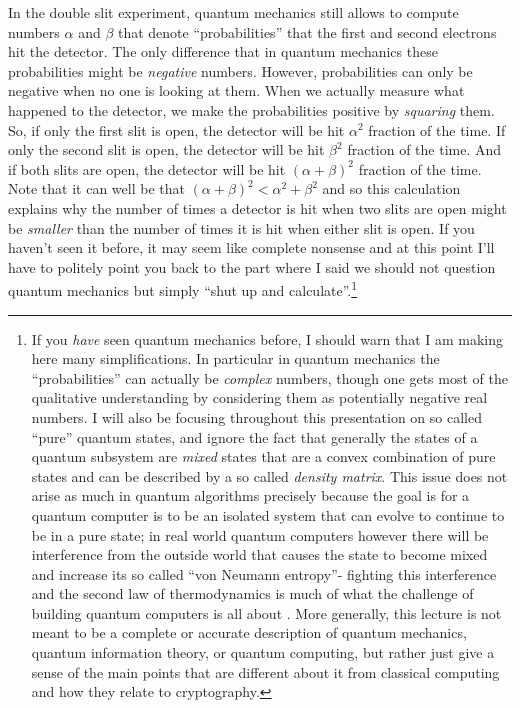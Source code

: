 In the double slit experiment, quantum mechanics still allows to compute
numbers \(\alpha\) and \(\beta\) that denote ``probabilities'' that the
first and second electrons hit the detector. The only difference that in
quantum mechanics these probabilities might be \emph{negative} numbers.
However, probabilities can only be negative when no one is looking at
them. When we actually measure what happened to the detector, we make
the probabilities positive by \emph{squaring} them. So, if only the
first slit is open, the detector will be hit \(\alpha^2\) fraction of
the time. If only the second slit is open, the detector will be hit
\(\beta^2\) fraction of the time. And if both slits are open, the
detector will be hit \((\alpha+\beta)^2\) fraction of the time. Note
that it can well be that \((\alpha+\beta)^2 < \alpha^2 + \beta^2\) and
so this calculation explains why the number of times a detector is hit
when two slits are open might be \emph{smaller} than the number of times
it is hit when either slit is open. If you haven't seen it before, it
may seem like complete nonsense and at this point I'll have to politely
point you back to the part where I said we should not question quantum
mechanics but simply ``shut up and calculate''.\footnote{If you
  \emph{have} seen quantum mechanics before, I should warn that I am
  making here many simplifications. In particular in quantum mechanics
  the ``probabilities'' can actually be \emph{complex} numbers, though
  one gets most of the qualitative understanding by considering them as
  potentially negative real numbers. I will also be focusing throughout
  this presentation on so called ``pure'' quantum states, and ignore the
  fact that generally the states of a quantum subsystem are \emph{mixed}
  states that are a convex combination of pure states and can be
  described by a so called \emph{density matrix}. This issue does not
  arise as much in quantum algorithms precisely because the goal is for
  a quantum computer is to be an isolated system that can evolve to
  continue to be in a pure state; in real world quantum computers
  however there will be interference from the outside world that causes
  the state to become mixed and increase its so called ``von Neumann
  entropy''- fighting this interference and the second law of
  thermodynamics is much of what the challenge of building quantum
  computers is all about . More generally, this lecture is not meant to
  be a complete or accurate description of quantum mechanics, quantum
  information theory, or quantum computing, but rather just give a sense
  of the main points that are different about it from classical
  computing and how they relate to cryptography.}


